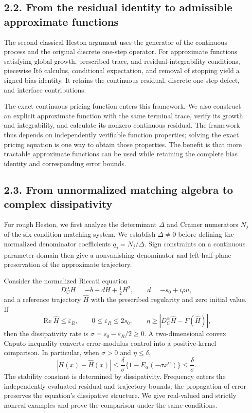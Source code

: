 \documentclass[a4paper,11pt]{article}
\begin{document}
\subsection*{2.2. From the residual identity to admissible approximate functions}

The second classical Heston argument uses the generator of the continuous process and the original discrete one-step operator. For approximate functions satisfying global growth, prescribed trace, and residual-integrability conditions, piecewise Itô calculus, conditional expectation, and removal of stopping yield a signed bias identity. It retains the continuous residual, discrete one-step defect, and interface contributions.

The exact continuous pricing function enters this framework. We also construct an explicit approximate function with the same terminal trace, verify its growth and integrability, and calculate its nonzero continuous residual. The framework thus depends on independently verifiable function properties; solving the exact pricing equation is one way to obtain those properties. The benefit is that more tractable approximate functions can be used while retaining the complete bias identity and corresponding error bounds.

\subsection*{2.3. From unnormalized matching algebra to complex dissipativity}

For rough Heston, we first analyze the determinant \(\Delta\) and Cramer numerators \(N_j\) of the six-condition matching system. We establish \(\Delta\ne0\) before defining the normalized denominator coefficients \(q_j=N_j/\Delta\). Sign constraints on a continuous parameter domain then give a nonvanishing denominator and left-half-plane preservation of the approximate trajectory.

Consider the normalized Riccati equation
\[
D_C^\alpha H=-b+dH+\tfrac12H^2,
\qquad d=-s_0+i\rho u,
\]
and a reference trajectory \(\widehat H\) with the prescribed regularity and zero initial value. If
\[
\operatorname{Re}\widehat H\le\varepsilon_R,
\qquad 0\le\varepsilon_R\le2s_0,
\qquad
\eta\ge|D_C^\alpha\widehat H-F(\widehat H)|,
\]
then the dissipativity rate is \(\sigma=s_0-\varepsilon_R/2\ge0\). A two-dimensional convex Caputo inequality converts error-modulus control into a positive-kernel comparison. In particular, when \(\sigma>0\) and \(\eta\le\delta\),
\[
|H(x)-\widehat H(x)|
\le\frac{\delta}{\sigma}
\{1-E_\alpha(-\sigma x^\alpha)\}
\le\frac{\delta}{\sigma}.
\]
The stability constant is determined by dissipativity. Frequency enters the independently evaluated residual and trajectory bounds; the propagation of error preserves the equation's dissipative structure. We give real-valued and strictly nonreal examples and prove the comparison under the same conditions.
\end{document}
